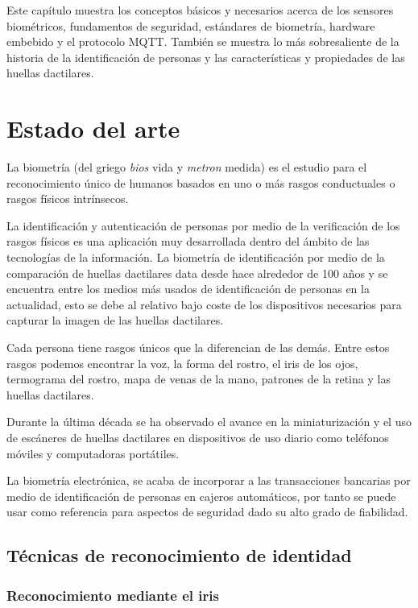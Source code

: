 \documentclass[../principal]{subfiles}
\begin{document}
\espacio

  Este capítulo muestra los conceptos básicos y necesarios acerca de los sensores biométricos, fundamentos de seguridad, estándares de biometría, hardware embebido y el protocolo MQTT. También se muestra lo más sobresaliente de la historia de la identificación de personas y las características y propiedades de las huellas dactilares.

  \section{Estado del arte}

  La biometría (del griego \emph{bios} vida y \emph{metron} medida) es el estudio  para el reconocimiento único de humanos basados en uno o más rasgos conductuales o rasgos físicos intrínsecos.\cite{libro:tecnologias_biometricas_aplicadas_seguridad}

  La identificación y autenticación de personas por medio de la verificación de los rasgos físicos es una aplicación muy desarrollada dentro del ámbito de las tecnologías de la información. La biometría de identificación por medio de la comparación de huellas dactilares data desde hace alrededor de 100 años y se encuentra entre los medios más usados de identificación de personas en la actualidad, esto se debe al relativo bajo coste de los dispositivos necesarios para capturar la imagen de las huellas dactilares.

  Cada persona tiene rasgos únicos que la diferencian de las demás. Entre estos rasgos podemos encontrar la voz, la forma del rostro, el iris de los ojos, termograma del rostro, mapa de venas de la mano, patrones de la retina y las huellas dactilares.

  Durante la última década se ha observado el avance en la miniaturización y el uso de escáneres de huellas dactilares en dispositivos de uso diario como teléfonos móviles y computadoras portátiles.

  La biometría electrónica, se acaba de incorporar a las transacciones bancarias por medio de identificación de personas en cajeros automáticos, por tanto se puede usar como referencia para aspectos de seguridad dado su alto grado de fiabilidad.

  \subsection{Técnicas de reconocimiento de identidad}

  \subsubsection{Reconocimiento mediante el iris}
\end{document}
